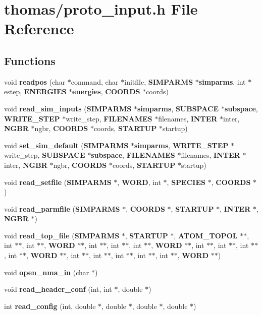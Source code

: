 \section{thomas/proto\_\-input.h File Reference}
\label{thomas_2proto__input_8h}
\subsection*{Functions}
\begin{CompactItemize}
\item 
void {\bf readpos} (char $\ast$command, char $\ast$initfile, {\bf SIMPARMS} $\ast${\bf simparms}, int $\ast$estep, {\bf ENERGIES} $\ast${\bf energies}, {\bf COORDS} $\ast$coords)
\item 
void {\bf read\_\-sim\_\-inputs} ({\bf SIMPARMS} $\ast${\bf simparms}, {\bf SUBSPACE} $\ast${\bf subspace}, {\bf WRITE\_\-STEP} $\ast$write\_\-step, {\bf FILENAMES} $\ast$filenames, {\bf INTER} $\ast$inter, {\bf NGBR} $\ast$ngbr, {\bf COORDS} $\ast$coords, {\bf STARTUP} $\ast$startup)
\item 
void {\bf set\_\-sim\_\-default} ({\bf SIMPARMS} $\ast${\bf simparms}, {\bf WRITE\_\-STEP} $\ast$write\_\-step, {\bf SUBSPACE} $\ast${\bf subspace}, {\bf FILENAMES} $\ast$filenames, {\bf INTER} $\ast$inter, {\bf NGBR} $\ast$ngbr, {\bf COORDS} $\ast$coords, {\bf STARTUP} $\ast$startup)
\item 
void {\bf read\_\-setfile} ({\bf SIMPARMS} $\ast$, {\bf WORD}, int $\ast$, {\bf SPECIES} $\ast$, {\bf COORDS} $\ast$)
\item 
void {\bf read\_\-parmfile} ({\bf SIMPARMS} $\ast$, {\bf COORDS} $\ast$, {\bf STARTUP} $\ast$, {\bf INTER} $\ast$, {\bf NGBR} $\ast$)
\item 
void {\bf read\_\-top\_\-file} ({\bf SIMPARMS} $\ast$, {\bf STARTUP} $\ast$, {\bf ATOM\_\-TOPOL} $\ast$$\ast$, int $\ast$$\ast$, int $\ast$$\ast$, {\bf WORD} $\ast$$\ast$, int $\ast$$\ast$, int $\ast$$\ast$, int $\ast$$\ast$, {\bf WORD} $\ast$$\ast$, int $\ast$$\ast$, int $\ast$$\ast$, int $\ast$$\ast$, int $\ast$$\ast$, {\bf WORD} $\ast$$\ast$, int $\ast$$\ast$, int $\ast$$\ast$, int $\ast$$\ast$, int $\ast$$\ast$, int $\ast$$\ast$, {\bf WORD} $\ast$$\ast$)
\item 
void {\bf open\_\-nma\_\-in} (char $\ast$)
\item 
void {\bf read\_\-header\_\-conf} (int, int $\ast$, double $\ast$)
\item 
int {\bf read\_\-config} (int, double $\ast$, double $\ast$, double $\ast$, double $\ast$)
$$
\end{CompactItemize}
